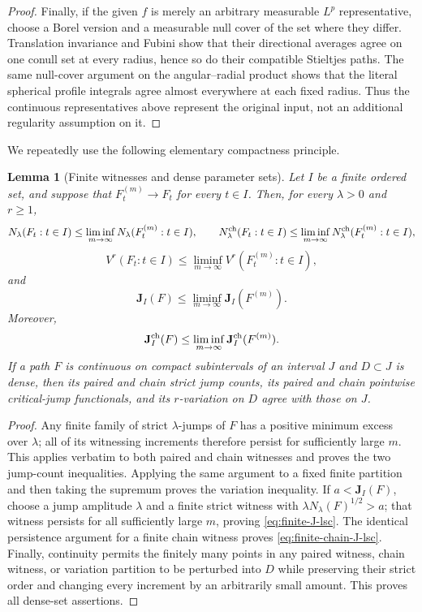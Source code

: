 \documentclass[11pt]{article}
\numberwithin{equation}{section}
\newtheorem{lemma}[theorem]{Lemma}
\theoremstyle{remark}
\theoremstyle{definition}
\begin{document}
\begin{proof}
Finally, if the given $f$ is merely an arbitrary measurable $L^p$
representative, choose a Borel version and a measurable null cover of
the set where they differ.  Translation invariance and Fubini show
that their directional averages agree on one conull set at every
radius, hence so do their compatible Stieltjes paths.  The same null-cover
argument on the angular--radial product shows that the literal
spherical profile integrals agree almost everywhere at each fixed
radius.  Thus the continuous representatives above represent the
original input, not an additional regularity assumption on it.
\end{proof}

We repeatedly use the following elementary compactness principle.

\begin{lemma}[Finite witnesses and dense parameter sets]
\label{lem:finite-witness}
Let $I$ be a finite ordered set, and suppose that
$F^{(m)}_t\to F_t$ for every $t\in I$.  Then, for every $\lambda>0$ and
$r\ge1$,
\[
 N_\lambda(F_t:t\in I)
 \le\liminf_{m\to\infty}N_\lambda(F^{(m)}_t:t\in I),
 \qquad
 N^{\rm ch}_\lambda(F_t:t\in I)
 \le\liminf_{m\to\infty}N^{\rm ch}_\lambda(F^{(m)}_t:t\in I),
\]
\[
 V^r(F_t:t\in I)
 \le\liminf_{m\to\infty}V^r(F^{(m)}_t:t\in I),
\]
and
\begin{equation}\label{eq:finite-J-lsc}
 \mathbf J_I(F)\le\liminf_{m\to\infty}\mathbf J_I(F^{(m)}).
\end{equation}
Moreover,
\begin{equation}\label{eq:finite-chain-J-lsc}
 \mathbf J_I^{\rm ch}(F)
 \le\liminf_{m\to\infty}\mathbf J_I^{\rm ch}(F^{(m)}).
\end{equation}
If a path $F$ is continuous on compact subintervals of an interval $J$
and $D\subset J$ is dense, then its paired and chain strict jump counts,
its paired and chain pointwise critical-jump functionals, and its
$r$-variation on $D$ agree with those on $J$.
\end{lemma}

\begin{proof}
Any finite family of strict $\lambda$-jumps of $F$ has a positive minimum
excess over $\lambda$; all of its witnessing increments therefore persist
for sufficiently large $m$.  This applies verbatim to both paired and
chain witnesses and proves the two jump-count inequalities.  Applying
the same argument to a fixed finite partition and then taking the
supremum proves the variation inequality.  If $a<\mathbf J_I(F)$, choose a jump amplitude
$\lambda$ and a finite strict witness with
$\lambda N_\lambda(F)^{1/2}>a$; that witness persists for all sufficiently
large $m$, proving \eqref{eq:finite-J-lsc}.  The identical persistence
argument for a finite chain witness proves
\eqref{eq:finite-chain-J-lsc}.  Finally, continuity permits the finitely
many points in any paired witness, chain witness, or variation partition
to be perturbed into $D$ while preserving their strict order and changing
every increment by an arbitrarily small amount.  This proves all dense-set
assertions.
\end{proof}
\end{document}
